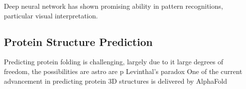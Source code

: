 Deep neural network has shown promising ability in pattern recognitions, particular visual interpretation.
\par 

\subsection{Protein Structure Prediction}
Predicting protein folding is challenging, largely due to it large degrees of freedom, the possibilities are astro are p Levinthal's paradox One of the current advancement in predicting protein 3D structures is delivered by AlphaFold